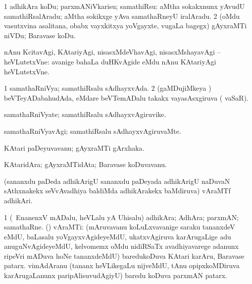 {\bentry
{} 
\gl{\sakirx}
\expl{}
\bmng
\bnum
\num{1} adhikAra koDu; parxmANiVkarisu; samathiRsu:  aMtha sokakxnunx yAvudU samathiRsalAradu; aMtha sokikxge yAva samathaRneyU iralAradu. 
\num{2} (oMdu vasutxvina asalitana, obabx vayxkitxya yoVgayxte, \mo vugaLa bagegx) gAyxraMTi niVDu; Baravase koDu. 
\enum
\emng

\noindent 
\gl{\pagu}
\expl{}
\bmng
{} nAnu KcitavAgi, KAtariyAgi, nisasxMdeVhavAgi, nisasxMshayavAgi -- heVLutetxVne:  avanige bahaLa duHKvAgide eMdu nAnu KAtariyAgi heVLutetxVne. 
\emng
\eentry

\bentry
{} 
\gl{\gu}
\expl{}
\bmng
\bnum
\num{1} samathaRniVya; samathiRsalu sAdhayxvAda. 
\num{2} (gaMDujiMkeya \vi) beVTeyADabahudAda, eMdare beVTemADalu takakx vayasAsxgiruva ( vaSaR). 
\enum
\emng
\eentry

\bentry
{} 
\gl{\nA}
\expl{}
\bmng
samathaRniVyate; samathiRsalu sAdhayxvAgiruvike. 
\emng
\eentry

\bentry
{} 
\gl{\kirxvi}
\expl{}
\bmng
samathaRniVyavAgi; samathiRsalu sAdhayxvAgiruvaMte. 
\emng
\eentry

\bentry
{} 
\gl{\nA}
\expl{}
\bmng
KAtari paDeyuvavanu; gAyxraMTi gArxhaka. 
\emng
\eentry

\bentry
{} 
\gl{\nA}
\expl{}
\bmng
KAtaridAra; gAyxraMTidAta; Baravase koDuvavanu. 
\emng
\eentry

\bentry
{} 
\gl{\nA}
\expl{}
\bmng
(sananxdu paDeda adhikArigU sananxdu paDeyada adhikArigU naDuvaN sAthxnakekx seVvAvadhiya baldiMda adhikArakekx baMdiruva) vAraMTf adhikAri. 
\emng
\eentry

\bentry
{} 
\gl{\nA}
\expl{}
\bmng
{} 
\emng
\eentry

\bentry
{} 
\gl{\nA}
\bmng
\bnum
\num{1} (\sA\ EnanenxV mADalu, heVLalu yA Uhisalu) adhikAra; AdhAra; parxmAN; samathaRne. 
 (\nAyxshA) vAraMTi: 
\banum
{} (mAruvavanu koLuLxvavanige saraku tananxdeV eMdU, baLasalu yoVgayxvAgideyeMdU, ukatxvAgiruva karArugaLige adu anuguNvAgideyeMdU, kelvomemx oMdu nidiRSaTx avadhiyavarege adanunx ripeVri mADuva hoNe tananxdeMdU) baredukoDuva KAtari karAru, Baravase patarx. 
 vimAdAranu (tananx heVLikegaLu nijveMdU, tAnu opipxkoMDiruva karArugaLanunx paripAlisuvudAgiyU) baredu koDuva parxmAN patarx. 
\eanum
\numie
\enum
\emng
\eentry

}
